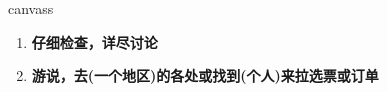 
\begin{frame}
{\huge canvass}
\begin{center}
\begin{enumerate}\Large
  \item \textbf{仔细检查，详尽讨论}
  \item \textbf{游说，去(一个地区)的各处或找到(个人)来拉选票或订单}
\end{enumerate}
\end{center}
\end{frame}
